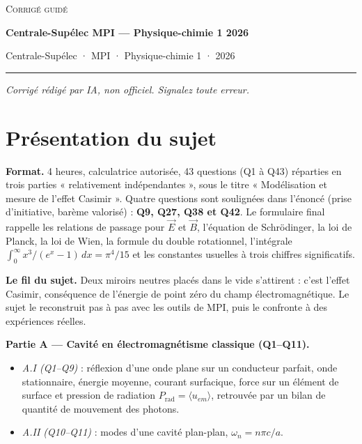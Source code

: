 \documentclass[11pt,a4paper]{article}
\providecommand{\tightlist}{\setlength{\itemsep}{0pt}\setlength{\parskip}{0pt}}
\begin{document}
\thispagestyle{plain}
\begin{center}
  {\small\scshape Corrigé guidé}\par\smallskip
  {\LARGE\bfseries Centrale-Supélec MPI — Physique-chimie 1 2026\par}\medskip
  {\large Centrale-Supélec · MPI · Physique-chimie 1 · 2026\par}
\end{center}
\vspace{2pt}\hrule\vspace{8pt}

\emph{Corrigé rédigé par IA, non officiel. Signalez toute erreur.}

\hypertarget{pruxe9sentation-du-sujet}{%
\section{Présentation du sujet}\label{pruxe9sentation-du-sujet}}

\textbf{Format.} 4 heures, calculatrice autorisée, 43 questions (Q1 à Q43) réparties en trois parties « relativement indépendantes », sous le titre « Modélisation et mesure de l'effet Casimir ». Quatre questions sont soulignées dans l'énoncé (prise d'initiative, barème valorisé) : \textbf{Q9, Q27, Q38 et Q42}. Le formulaire final rappelle les relations de passage pour \(\vec E\) et \(\vec B\), l'équation de Schrödinger, la loi de Planck, la loi de Wien, la formule du double rotationnel, l'intégrale \(\int_0^\infty x^3/(e^x-1)\,dx=\pi^4/15\) et les constantes usuelles à trois chiffres significatifs.

\textbf{Le fil du sujet.} Deux miroirs neutres placés dans le vide s'attirent : c'est l'effet Casimir, conséquence de l'énergie de point zéro du champ électromagnétique. Le sujet le reconstruit pas à pas avec les outils de MPI, puis le confronte à des expériences réelles.

\textbf{Partie A --- Cavité en électromagnétisme classique (Q1--Q11).}

\begin{itemize}
\tightlist
\item
  \emph{A.I (Q1--Q9)} : réflexion d'une onde plane sur un conducteur parfait, onde stationnaire, énergie moyenne, courant surfacique, force sur un élément de surface et pression de radiation \(P_{\mathrm{rad}}=\langle u_{em}\rangle\), retrouvée par un bilan de quantité de mouvement des photons.
\item
  \emph{A.II (Q10--Q11)} : modes d'une cavité plan-plan, \(\omega_n=n\pi c/a\).
\end{itemize}
\end{document}

